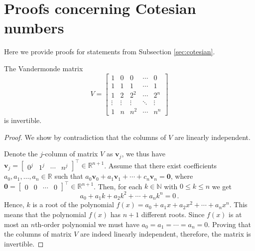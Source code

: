 \chapter{Proofs concerning Cotesian numbers}
\label{app:proofs}

Here we provide proofs for statements from Subsection \ref{sec:cotesian}.

\begin{lemma}
\label{lemma:invertible}
The Vandermonde matrix
\begin{equation}
    V =
    \begin{bmatrix}
        1&0&0&\cdots&0 \\
        1&1&1&\cdots&1 \\
        1&2&2^2&\cdots&2^n \\
        \vdots&\vdots & \vdots & \ddots & \vdots\\
        1&n&n^2&\cdots&n^n
    \end{bmatrix} \nonumber
\end{equation}
is invertible.
\end{lemma}
\begin{proof}
We show by contradiction that the columns of $V$ are linearly independent.

Denote the $j$-column of matrix $V$ as $\mathbf v_j$, we thus have $\mathbf v_j = \begin{bmatrix} 0^j & 1^j & \cdots & n^j \end{bmatrix}^\top \in \mathbb R^{n+1}$.
Assume that there exist coefficients $a_0, a_1, \dots, a_n \in \mathbb R$ such that $a_0 \mathbf v_0 + a_1 \mathbf v_1 + \cdots + c_n \mathbf v_n = \mathbf 0$, where $\mathbf 0 = \begin{bmatrix} 0 & 0 & \cdots & 0 \end{bmatrix}^\top \in \mathbb R^{n+1}$.
Then, for each $k\in \mathbb N$ with $0 \leq k \leq n$ we get
\begin{equation}
    a_0 + a_1 k + a_2 k^2 + \cdots + a_n k^n = 0 \,.\nonumber
\end{equation}
Hence, $k$ is a root of the polynomial $f(x) = a_0 + a_1 x + a_2 x^2 + \cdots + a_n x^n$.
This means that the polynomial $f(x)$ has $n+1$ different roots.
Since $f(x)$ is at most an $n$th-order polynomial we must have $a_0 = a_1 = \cdots = a_n = 0$.
Proving that the columns of matrix $V$ are indeed linearly independent, therefore, the matrix is invertible.
\end{proof}


